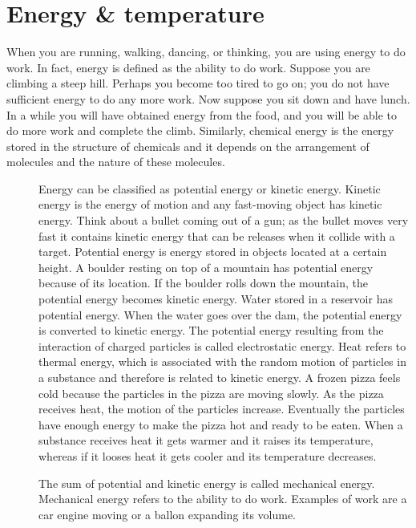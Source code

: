 \documentclass[main.tex]{subfiles}
\begin{document}
\section{Energy \& temperature}
When you are running, walking, dancing, or thinking, you are using energy to do work. In fact, energy is defined as the ability to do work. Suppose you are climbing a steep hill. Perhaps you become too tired to go on; you do not have sufficient energy to do any more work. Now suppose you sit down and have lunch. In a while you will have obtained energy from the food, and you will be able to do more work and complete the climb. Similarly, chemical energy is the energy stored in the structure of chemicals and it depends on the arrangement of molecules and the nature of these molecules.
\sloppy
\begin{description}

\item[] 
Energy can be classified as potential energy or kinetic energy. 
Kinetic energy is the energy of motion and any fast-moving object has kinetic energy. Think about a bullet coming out of a gun; as the bullet moves very fast it contains kinetic energy that can be releases when it collide with a target. Potential energy is energy stored in objects located at a certain height. A boulder resting on top of a mountain has potential energy because of its location. If the boulder rolls down the mountain, the potential energy becomes kinetic energy. Water stored in a reservoir has potential energy. When the water goes over the dam, the potential energy is converted to kinetic energy. The potential energy resulting from the interaction of charged particles is called electrostatic energy. Heat refers to thermal energy, which is associated with the random motion of particles in a substance and therefore is related to kinetic energy. A frozen pizza feels cold because the particles in the pizza are moving slowly. As the pizza receives heat, the motion of the particles increase. Eventually the particles have enough energy to make the pizza hot and ready to be eaten. When a substance receives heat it gets warmer and it raises its temperature, whereas if it looses heat it gets cooler and its temperature decreases. 
\item[] 
The sum of potential and kinetic energy is called mechanical energy. Mechanical energy refers to the ability to do work. Examples of work are a car engine moving or a ballon expanding its volume.



\end{description}
\end{document}
